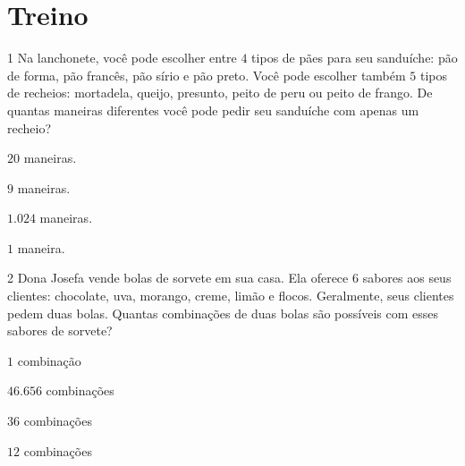 \section{Treino}

\num{1}  Na lanchonete, você pode escolher entre $4$ tipos de pães para seu
sanduíche: pão de forma, pão francês, pão sírio e pão preto. Você pode
escolher também $5$ tipos de recheios: mortadela, queijo, presunto, peito
de peru ou peito de frango. De quantas maneiras diferentes você pode
pedir seu sanduíche com apenas um recheio?

\begin{escolha}
\item $20$ maneiras.
\item $9$ maneiras.
\item $1.024$ maneiras.
\item $1$ maneira.
\end{escolha}



\num{2}  Dona Josefa vende bolas de sorvete em sua casa. Ela oferece $6$ sabores
aos seus clientes: chocolate, uva, morango, creme, limão e flocos.
Geralmente, seus clientes pedem duas bolas. Quantas combinações de duas
bolas são possíveis com esses sabores de sorvete?

\begin{escolha}
\item $1$ combinação
\item $46.656$ combinações
\item $36$ combinações
\item $12$ combinações
\end{escolha}

